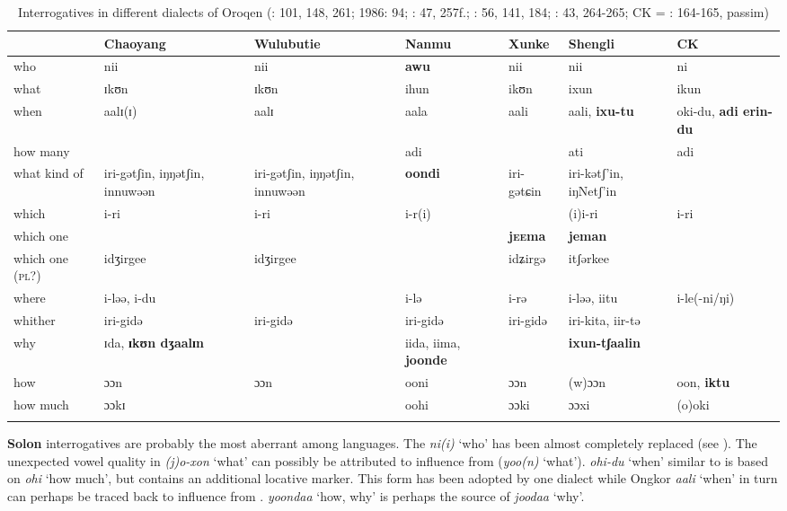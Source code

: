 \begin{table}
\caption{Interrogatives in different dialects of Oroqen (\citealt{HuZengyi2001}: 101, 148, 261; 1986: 94; \citealt{Chaoke2007}: 47, 257f.; \citealt{ZhangLiZhang1989}: 56, 141, 184; \citealt{HanMeng1993}: 43, 264-265; CK = \citealt{Chaoke2014a}: 164-165, passim)}
\label{tab:tungu:17}
\small
\begin{tabularx}{\textwidth}{lQQQlQQ}
\lsptoprule
& \textbf{Chaoyang} & \textbf{Wulubutie} & \textbf{Nanmu} & \textbf{Xunke} & \textbf{Shengli} & \textbf{CK}\\
\midrule
who & nii & nii & \textbf{awu} & nii & nii & ni\\
what & ɪkʊn & ɪkʊn & ihun & ikʊn & ixun & ikun\\
when & aalɪ(ɪ) & aalɪ & aala & aali & aali, \textbf{ixu-tu} & oki-du, \textbf{adi erin-du}\\
how many &  &  & adi &  & ati & adi\\
what kind of & iri-gətʃin, iŋŋətʃin, innuwəən & iri-gətʃin, iŋŋətʃin, innuwəən & \textbf{oondi} & iri-gətɕin & iri-kətʃ’in, iŋNetʃ’in & \\
which & i-ri & i-ri & i-r(i) &  & (i)i-ri & i-ri\\
which one &  &  &  & \textbf{j\textsc{ee}}\textbf{ma} & \textbf{jeman} & \\
which one (\textsc{pl?}) & idʒirgee & idʒirgee &  & idʑirgə & itʃərkee & \\
where & i-ləə, i-du &  & i-lə & i-rə & i-ləə, iitu & i-le(-ni/ŋi)\\
whither & iri-gidə & iri-gidə & iri-gidə & iri-gidə & iri-kita, iir-tə & \\
why & ɪda, \textbf{ɪkʊn dʒaalɪn} &  & iida, iima, \textbf{joonde} &  & \textbf{ixun-tʃaalin} & \\
how & ɔɔn & ɔɔn & ooni & ɔɔn & (w)ɔɔn & oon, \textbf{iktu}\\
how much & ɔɔkɪ &  & oohi & ɔɔki & ɔɔxi & (o)oki\\
\lspbottomrule
\end{tabularx}
\end{table}

\textbf{Solon} interrogatives are probably the most aberrant among  languages. The  \textit{ni(i)} ‘who’ has been almost completely replaced (see ). The unexpected vowel quality in \textit{(j)o-xon} ‘what’ can possibly be attributed to influence from  (\textit{yoo(n)} ‘what’). \textit{ohi-}\textit{du} ‘when’ similar to  is based on \textit{ohi} ‘how much’, but contains an additional locative marker. This form has been adopted by one  dialect while Ongkor  \textit{aali} ‘when’ in turn can perhaps be traced back to influence from .  \textit{yoondaa} ‘how, why’ is perhaps the source of \textit{joodaa} ‘why’.

